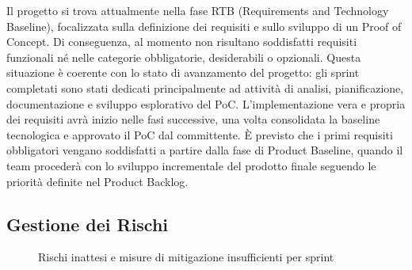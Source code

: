 \documentclass[a4paper,11pt,oneside]{scrartcl}
\begin{document}
Il progetto si trova attualmente nella fase RTB (Requirements and Technology Baseline), focalizzata sulla definizione dei requisiti e sullo sviluppo di un Proof of Concept. Di conseguenza, al momento non risultano soddisfatti requisiti funzionali né nelle categorie obbligatorie, desiderabili o opzionali. Questa situazione è coerente con lo stato di avanzamento del progetto: gli sprint completati sono stati dedicati principalmente ad attività di analisi, pianificazione, documentazione e sviluppo esplorativo del PoC. L'implementazione vera e propria dei requisiti avrà inizio nelle fasi successive, una volta consolidata la baseline tecnologica e approvato il PoC dal committente. È previsto che i primi requisiti obbligatori vengano soddisfatti a partire dalla fase di Product Baseline, quando il team procederà con lo sviluppo incrementale del prodotto finale seguendo le priorità definite nel Product Backlog{\scriptsize{}}.

\subsection{Gestione dei Rischi}

\begin{figure}[H]
\centering
{}
\caption{Rischi inattesi e misure di mitigazione insufficienti per sprint}
\label{fig:rischi}
\end{figure}
\end{document}
